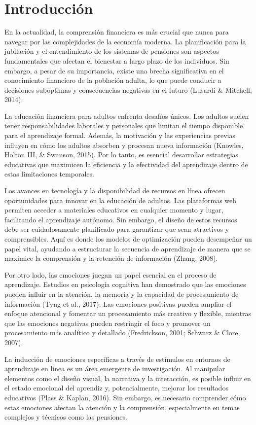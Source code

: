 \section{Introducción}

En la actualidad, la comprensión financiera es más crucial que nunca para navegar por las complejidades de la economía moderna. La planificación para la jubilación y el entendimiento de los sistemas de pensiones son aspectos fundamentales que afectan el bienestar a largo plazo de los individuos. Sin embargo, a pesar de su importancia, existe una brecha significativa en el conocimiento financiero de la población adulta, lo que puede conducir a decisiones subóptimas y consecuencias negativas en el futuro (Lusardi \& Mitchell, 2014).

La educación financiera para adultos enfrenta desafíos únicos. Los adultos suelen tener responsabilidades laborales y personales que limitan el tiempo disponible para el aprendizaje formal. Además, la motivación y las experiencias previas influyen en cómo los adultos absorben y procesan nueva información (Knowles, Holton III, \& Swanson, 2015). Por lo tanto, es esencial desarrollar estrategias educativas que maximicen la eficiencia y la efectividad del aprendizaje dentro de estas limitaciones temporales.

Los avances en tecnología y la disponibilidad de recursos en línea ofrecen oportunidades para innovar en la educación de adultos. Las plataformas web permiten acceder a materiales educativos en cualquier momento y lugar, facilitando el aprendizaje autónomo. Sin embargo, el diseño de estos recursos debe ser cuidadosamente planificado para garantizar que sean atractivos y comprensibles. Aquí es donde los modelos de optimización pueden desempeñar un papel vital, ayudando a estructurar la secuencia de aprendizaje de manera que se maximice la comprensión y la retención de información (Zhang, 2008).

Por otro lado, las emociones juegan un papel esencial en el proceso de aprendizaje. Estudios en psicología cognitiva han demostrado que las emociones pueden influir en la atención, la memoria y la capacidad de procesamiento de información (Tyng et al., 2017). Las emociones positivas pueden ampliar el enfoque atencional y fomentar un procesamiento más creativo y flexible, mientras que las emociones negativas pueden restringir el foco y promover un procesamiento más analítico y detallado (Fredrickson, 2001; Schwarz \& Clore, 2007).

La inducción de emociones específicas a través de estímulos en entornos de aprendizaje en línea es un área emergente de investigación. Al manipular elementos como el diseño visual, la narrativa y la interacción, es posible influir en el estado emocional del aprendiz y, potencialmente, mejorar los resultados educativos (Plass \& Kaplan, 2016). Sin embargo, es necesario comprender cómo estas emociones afectan la atención y la comprensión, especialmente en temas complejos y técnicos como las pensiones.

